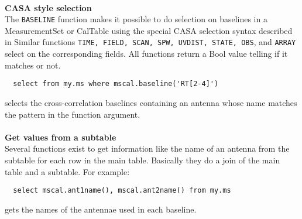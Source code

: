 \paragraph*{}
{\bf CASA style selection}
\\The \texttt{BASELINE} function makes it possible to do selection on
baselines in a MeasurementSet or CalTable using the special
CASA selection syntax described in 
Similar functions \texttt{TIME, FIELD, SCAN, SPW, UVDIST, STATE, OBS}, and
\texttt{ARRAY} select on the corresponding fields. 
All functions return a Bool value telling if it matches or not.
\begin{verbatim}
  select from my.ms where mscal.baseline('RT[2-4]')
\end{verbatim}
selects the cross-correlation baselines containing an antenna whose
name matches the pattern in the function argument.

\paragraph*{}
{\bf Get values from a subtable}
\\Several functions exist to get information like the name of an antenna
from the subtable for each row in the main table. Basically they do a
join of the main table and a subtable. For example:
\begin{verbatim}
  select mscal.ant1name(), mscal.ant2name() from my.ms
\end{verbatim}
gets the names of the antennae used in each baseline.

